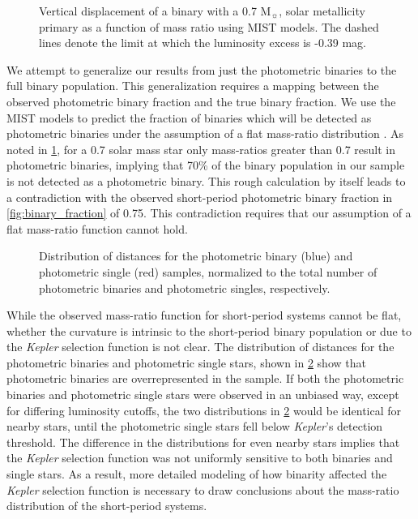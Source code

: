\documentclass[manuscript]{aastex6}
\newcommand{\Kepler}{\mbox{\textit{Kepler}}}
\begin{document}
\begin{figure}[htb]
    \centering
    \caption{Vertical displacement of a binary with a 0.7 M\(_\sun\), solar
    metallicity primary as a function of mass ratio using MIST models. The
dashed lines denote the limit at which the luminosity excess is -0.39 mag.}
    \label{fig:photometric_massratio}
\end{figure}

We attempt to generalize our results from just the photometric binaries to the
full binary population. This generalization requires a mapping between the
observed photometric binary fraction and the true binary fraction. We use the
MIST models to predict the fraction of binaries which will be detected as
photometric binaries under the assumption of a flat mass-ratio distribution
\citep{Raghavan10}. As noted in \cref{fig:photometric_massratio}, for a 0.7
solar mass star only mass-ratios greater than 0.7 result in photometric
binaries, implying that 70\% of the binary population in our sample is not
detected as a photometric binary. This rough calculation by itself leads to a
contradiction with the observed short-period photometric binary fraction in 
\cref{fig:binary_fraction} of 0.75. This contradiction requires that our
assumption of a flat mass-ratio function cannot hold.

\begin{figure}[htb]
    \centering
    \caption{Distribution of distances for the photometric binary (blue) and
    photometric single (red) samples, normalized to the total number of
photometric binaries and photometric singles, respectively.}
    \label{fig:distance_dist}
\end{figure}

While the observed mass-ratio function for short-period systems cannot be flat,
whether the curvature is intrinsic to the short-period binary population or due
to the \Kepler{} selection function is not clear. The distribution of 
distances for the photometric binaries and photometric single stars, shown in
\cref{fig:distance_dist} show that photometric binaries are overrepresented in
the sample. If both the photometric binaries and photometric single stars were
observed in an unbiased way, except for differing luminosity cutoffs, the two
distributions in \cref{fig:distance_dist} would be identical for nearby stars,
until the photometric single stars fell below \Kepler{}'s detection threshold.
The difference in the distributions for even nearby stars implies that the
\Kepler{} selection function was not uniformly sensitive to both binaries and
single stars. As a result, more detailed modeling of how binarity affected the
\Kepler{} selection function is necessary to draw conclusions about the
mass-ratio distribution of the short-period systems.
\end{document}
